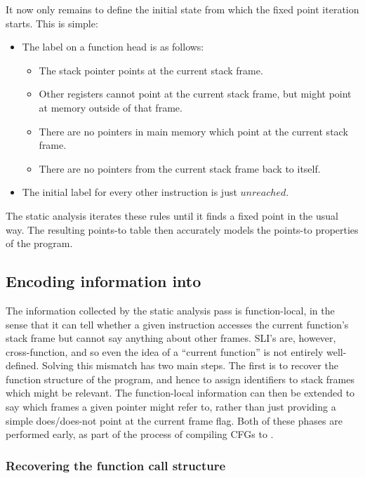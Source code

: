 It now only remains to define the initial state from which the fixed
point iteration starts.  This is simple:

\begin{itemize}
\item
  The label on a function head is as follows:

  \begin{itemize}
  \item The stack pointer points at the current stack frame.
  \item Other registers cannot point at the current stack frame, but
    might point at memory outside of that frame.
  \item There are no pointers in main memory which point at the current
    stack frame.
  \item There are no pointers from the current stack frame back to
    itself.
  \end{itemize}
\item
  The initial label for every other instruction is just $unreached$.
\end{itemize}

The static analysis iterates these rules until it finds a fixed point
in the usual way.  The resulting points-to table then accurately
models the points-to properties of the program.


\subsection{Encoding information into \StateMachines}

The information collected by the static analysis pass is
function-local, in the sense that it can tell whether a given
instruction accesses the current function's stack frame but cannot say
anything about other frames.  SLI's \StateMachines are, however,
cross-function, and so even the idea of a ``current function'' is not
entirely well-defined.  Solving this mismatch has two main steps.  The
first is to recover the function structure of the program, and hence
to assign identifiers to stack frames which might be relevant.  The
function-local information can then be extended to say which frames a
given pointer might refer to, rather than just providing a simple
does/does-not point at the current frame flag.  Both of these phases
are performed early, as part of the process of compiling CFGs to
{\StateMachines}.

\subsubsection{Recovering the function call structure}

